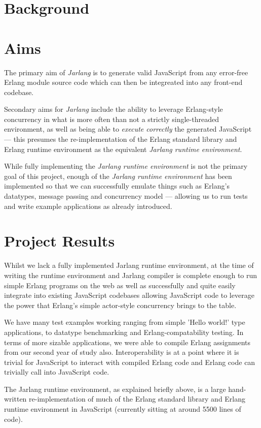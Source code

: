 \documentclass[twoside,12pt,titlepage,a4paper]{article}
\begin{document}
\section{Background}
\label{Background}

\section{Aims}
\label{Aims}
The primary aim of \textit{Jarlang} is to generate valid JavaScript from any error-free Erlang module source code which can then be integreated into any front-end codebase.

Secondary aims for \textit{Jarlang} include the ability to leverage Erlang-style concurrency in what is more often than not a strictly single-threaded environment, as well as being able to \textit{execute correctly} the generated JavaScript --- this presumes the re-implementation of the Erlang standard library and Erlang runtime environment as the equivalent \textit{Jarlang runtime environment}.

While fully implementing the \textit{Jarlang runtime environment} is not the primary goal of this project, enough of the \textit{Jarlang runtime environment} has been implemented so that we can successfully emulate things such as Erlang's datatypes, message passing and concurrency model --- allowing us to run tests and write example applications as already introduced.

\section{Project Results}
\label{Results}
Whilst we lack a fully implemented Jarlang runtime environment, at the time of writing the runtime environment and Jarlang compiler is complete enough to run simple Erlang programs on the web as well as successfully and quite easily integrate into existing JavaScript codebases allowing JavaScript code to leverage the power that Erlang's simple actor-style concurrency brings to the table.

We have many test examples working ranging from simple 'Hello world!' type applications, to datatype benchmarking and Erlang-compatability testing. In terms of more sizable applications, we were able to compile Erlang assignments from our second year of study also. Interoperability is at a point where it is trivial for JavaScript to interact with compiled Erlang code and Erlang code can trivially call into JavaScript code.

The Jarlang runtime environment, as explained briefly above, is a large hand-written re-implementation of much of the Erlang standard library and Erlang runtime environment in JavaScript (currently sitting at around 5500 lines of code). 
\end{document}
